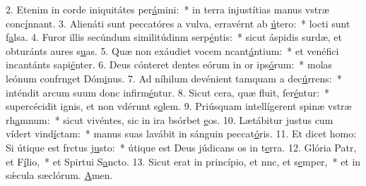2. Etenim in corde iniquitátes per\uline{á}mini:~* in terra injustítias manus vstræ conc\uline{í}nnant.
3. Alienáti sunt peccatóres a vulva, erravérnt ab \uline{ú}tero:~* locti sunt f\uline{a}lsa.
4. Furor illis secúndum similitúdinm serp\uline{é}ntis:~* sicut áspidis surdæ, et obturánts aures s\uline{u}as.
5. Quæ non exáudiet vocem ncant\uline{á}ntium:~* et venéfici incantánts sapi\uline{é}nter.
6. Deus cónteret dentes eórum in or ips\uline{ó}rum:~* molas leónum confrnget Dóm\uline{i}nus.
7. Ad níhilum devénient tamquam a dec\uline{ú}rrens:~* inténdit arcum suum donc infirm\uline{é}ntur.
8. Sicut cera, quæ fluit, fer\uline{é}ntur:~* supercécidit ignis, et non vdérunt s\uline{o}lem.
9. Priúsquam intellígerent spinæ vstræ rh\uline{a}mnum:~* sicut vivéntes, sic in ira bsórbet \uline{e}os.
10. Lætábitur justus cum vídert vind\uline{í}ctam:~* manus suas lavábit in sánguin peccat\uline{ó}ris.
11. Et dicet homo: Si útique est frctus j\uline{u}sto:~* útique est Deus júdicans os in t\uline{e}rra.
12. Glória Patr, et F\uline{í}lio,~* et Spirtui S\uline{a}ncto.
13. Sicut erat in princípio, et nnc, et s\uline{e}mper,~* et in sǽcula sæclórum. \uline{A}men.
